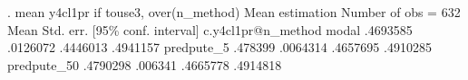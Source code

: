 . mean y4cl1pr if touse3, over(n_method)
{\smallskip}
Mean estimation                                  Number of obs = 632
{\smallskip}
                   {\VBAR}       Mean   Std. err.     [95\% conf. interval]
c.y4cl1pr@n_method {\VBAR}
            modal  {\VBAR}   .4693585   .0126072      .4446013    .4941157
       predpute_5  {\VBAR}    .478399   .0064314      .4657695    .4910285
      predpute_50  {\VBAR}   .4790298    .006341      .4665778    .4914818
